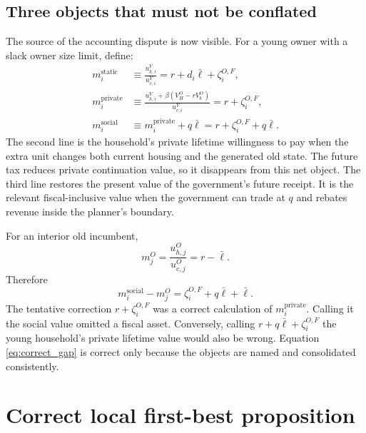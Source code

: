 \documentclass[11pt]{article}
\newcommand{\1}{\mathbf 1}
\newcommand{\ellbar}{\bar\ell}
\begin{document}
\subsection{Three objects that must not be conflated}

The source of the accounting dispute is now visible. For a young owner with a
slack owner size limit, define:
\begin{align}
m_i^{\mathrm{static}}
&\equiv\frac{u_{h,i}^Y}{u_{c,i}^Y}
=r+d_i\ellbar+\zeta_i^{O,F},
\label{eq:mstatic}\\
m_i^{\mathrm{private}}
&\equiv
\frac{u_{h,i}^Y+\beta(V_H^O-rV_b^O)}{u_{c,i}^Y}
=r+\zeta_i^{O,F},
\label{eq:mprivate}\\
m_i^{\mathrm{social}}
&\equiv m_i^{\mathrm{private}}+q\ellbar
=r+\zeta_i^{O,F}+q\ellbar.
\label{eq:msocial}
\end{align}
The second line is the household's private lifetime willingness to pay when
the extra unit changes both current housing and the generated old state. The
future tax reduces private continuation value, so it disappears from this
net object. The third line restores the present value of the government's
future receipt. It is the relevant fiscal-inclusive value when the government
can trade at $q$ and rebates revenue inside the planner's boundary.

For an interior old incumbent,
\begin{equation}
m_j^O=\frac{u_{h,j}^O}{u_{c,j}^O}=r-\ellbar.
\label{eq:mold}
\end{equation}
Therefore
\begin{equation}
\boxed{
m_i^{\mathrm{social}}-m_j^O
=\zeta_i^{O,F}+q\ellbar+\ellbar.}
\label{eq:correct_gap}
\end{equation}
The tentative correction $r+\zeta_i^{O,F}$ was a correct calculation of
$m_i^{\mathrm{private}}$. Calling it the social value omitted a fiscal asset.
Conversely, calling $r+q\ellbar+\zeta_i^{O,F}$ the young household's private
lifetime value would also be wrong. Equation \eqref{eq:correct_gap} is correct
only because the objects are named and consolidated consistently.

\section{Correct local first-best proposition}
\label{sec:firstbest}
\end{document}

